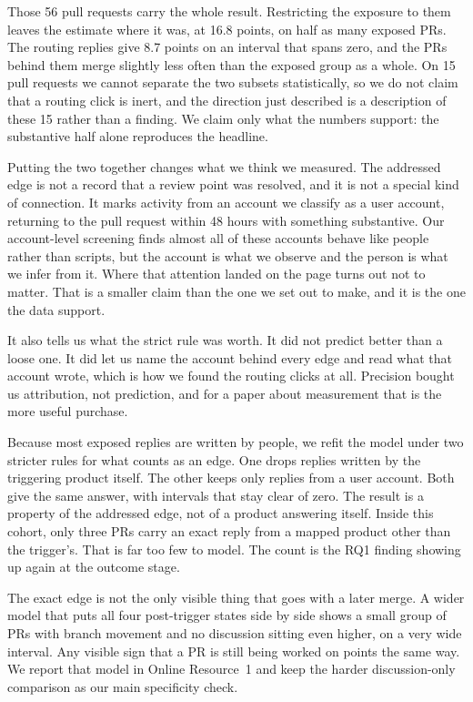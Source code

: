 \documentclass[lineno,pdflatex,sn-basic]{sn-jnl}
\begin{document}
Those 56 pull requests carry the whole result. Restricting the exposure to them
leaves the estimate where it was, at 16.8 points, on half as many exposed PRs. The
routing replies give 8.7 points on an interval that spans zero, and the PRs behind
them merge slightly less often than the exposed group as a whole. On 15 pull requests we cannot separate the two subsets
statistically, so we do not claim that a routing click is inert, and the direction
just described is a description of these 15 rather than a finding. We claim only what the numbers support: the substantive
half alone reproduces the headline.

Putting the two together changes what we think we measured. The addressed edge is
not a record that a review point was resolved, and it is not a special kind of
connection. It marks activity from an account we classify as a user account, returning to the
pull request within 48 hours with something substantive. Our account-level
screening finds almost all of these accounts behave like people rather than
scripts, but the account is what we observe and the person is what we infer from
it. Where that attention landed on the page turns out
not to matter. That is a smaller claim than the one we set out to make, and it is
the one the data support.

It also tells us what the strict rule was worth. It did not predict better than a
loose one. It did let us name the account behind every edge and read what that
account wrote, which is how we found the routing clicks at all. Precision bought
us attribution, not prediction, and for a paper about measurement that is the more
useful purchase.

Because most exposed replies are written by people, we refit the model under
two stricter rules for what counts as an edge. One drops replies written by the
triggering product itself. The other keeps only replies from a user account.
Both give the same answer, with intervals that stay clear of zero. The result is
a property of the addressed edge, not of a product answering itself. Inside this cohort, only three PRs carry an exact reply from a mapped product
other than the trigger's. That is far too few to model. The count is the RQ1 finding showing up
again at the outcome stage.

The exact edge is not the only visible thing that goes with a later merge. A
wider model that puts all four post-trigger states side by side shows a small
group of PRs with branch movement and no discussion sitting even higher, on a
very wide interval. Any visible sign that a PR is still being worked on points
the same way. We report that model in Online Resource~1 and keep the harder
discussion-only comparison as our main specificity check.
\end{document}
